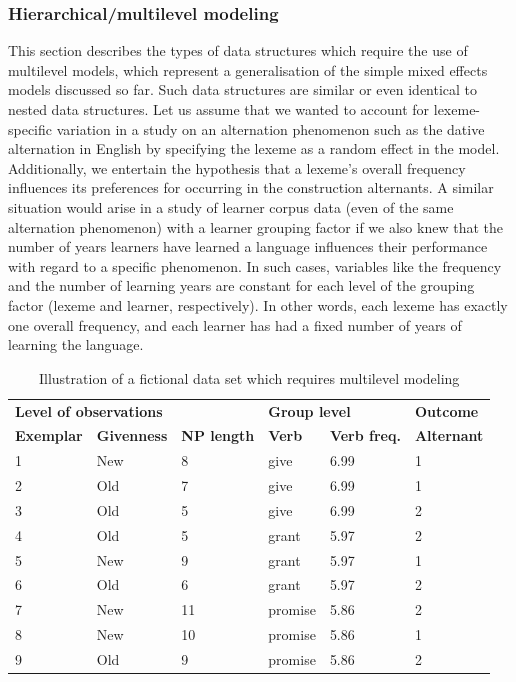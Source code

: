\subsubsection{Hierarchical\slash multilevel modeling}
\label{sec:hierarchicalormultilevelmodels}

This section describes the types of data structures which require the use of multilevel models, which represent a generalisation of the simple mixed effects models discussed so far.
Such data structures are similar or even identical to nested data structures.
Let us assume that we wanted to account for lexeme-specific variation in a study on an alternation phenomenon such as the dative alternation in English by specifying the lexeme as a random effect in the model.
Additionally, we entertain the hypothesis that a lexeme's overall frequency influences its preferences for occurring in the construction alternants.
A similar situation would arise in a study of learner corpus data (even of the same alternation phenomenon) with a learner grouping factor if we also knew that the number of years learners have learned a language influences their performance with regard to a specific phenomenon.
In such cases, variables like the frequency and the number of learning years are constant for each level of the grouping factor (lexeme and learner, respectively).
In other words, each lexeme has exactly one overall frequency, and each learner has had a fixed number of years of learning the language.

\begin{table}
  \centering
  \begin{tabular}{llllll}
    \toprule
    \multicolumn{3}{l}{\textbf{Level of observations}}          & \multicolumn{2}{l}{\textbf{Group level}}  & \textbf{Outcome} \\
    \textbf{Exemplar} & \textbf{Givenness} & \textbf{NP length} & \textbf{Verb} & \textbf{Verb freq.}       & \textbf{Alternant}\\
    \midrule
            1 &     New   &      8    &    give   &   6.99   & 1 \\
            2 &     Old   &      7    &    give   &   6.99   & 1 \\
            3 &     Old   &      5    &    give   &   6.99   & 2 \\
            4 &     Old   &      5    &    grant  &   5.97   & 2 \\
            5 &     New   &      9    &    grant  &   5.97   & 1 \\
            6 &     Old   &      6    &    grant  &   5.97   & 2 \\
            7 &     New   &      11   &   promise &   5.86   & 2 \\
            8 &     New   &      10   &   promise &   5.86   & 1 \\
            9 &     Old   &      9    &   promise &   5.86   & 2 \\
    \bottomrule
  \end{tabular}
  \caption{Illustration of a fictional data set which requires multilevel modeling}
  \label{tab:multilevel}
\end{table}

